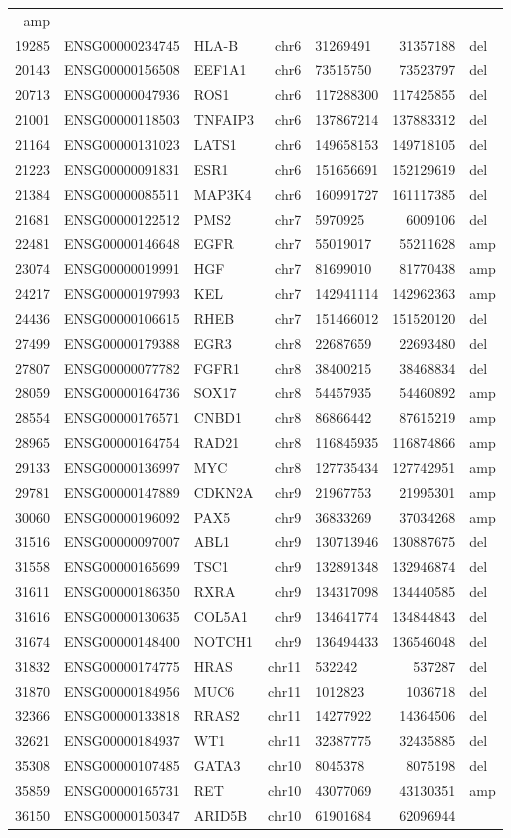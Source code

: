 \documentclass[]{article}
\begin{document}
\begin{longtable}[]{@{}rrlrlrl@{}}
amp\tabularnewline
19285 & ENSG00000234745 & HLA-B & chr6 & 31269491 & 31357188 &
del\tabularnewline
20143 & ENSG00000156508 & EEF1A1 & chr6 & 73515750 & 73523797 &
del\tabularnewline
20713 & ENSG00000047936 & ROS1 & chr6 & 117288300 & 117425855 &
del\tabularnewline
21001 & ENSG00000118503 & TNFAIP3 & chr6 & 137867214 & 137883312 &
del\tabularnewline
21164 & ENSG00000131023 & LATS1 & chr6 & 149658153 & 149718105 &
del\tabularnewline
21223 & ENSG00000091831 & ESR1 & chr6 & 151656691 & 152129619 &
del\tabularnewline
21384 & ENSG00000085511 & MAP3K4 & chr6 & 160991727 & 161117385 &
del\tabularnewline
21681 & ENSG00000122512 & PMS2 & chr7 & 5970925 & 6009106 &
del\tabularnewline
22481 & ENSG00000146648 & EGFR & chr7 & 55019017 & 55211628 &
amp\tabularnewline
23074 & ENSG00000019991 & HGF & chr7 & 81699010 & 81770438 &
amp\tabularnewline
24217 & ENSG00000197993 & KEL & chr7 & 142941114 & 142962363 &
amp\tabularnewline
24436 & ENSG00000106615 & RHEB & chr7 & 151466012 & 151520120 &
del\tabularnewline
27499 & ENSG00000179388 & EGR3 & chr8 & 22687659 & 22693480 &
del\tabularnewline
27807 & ENSG00000077782 & FGFR1 & chr8 & 38400215 & 38468834 &
del\tabularnewline
28059 & ENSG00000164736 & SOX17 & chr8 & 54457935 & 54460892 &
amp\tabularnewline
28554 & ENSG00000176571 & CNBD1 & chr8 & 86866442 & 87615219 &
amp\tabularnewline
28965 & ENSG00000164754 & RAD21 & chr8 & 116845935 & 116874866 &
amp\tabularnewline
29133 & ENSG00000136997 & MYC & chr8 & 127735434 & 127742951 &
amp\tabularnewline
29781 & ENSG00000147889 & CDKN2A & chr9 & 21967753 & 21995301 &
amp\tabularnewline
30060 & ENSG00000196092 & PAX5 & chr9 & 36833269 & 37034268 &
amp\tabularnewline
31516 & ENSG00000097007 & ABL1 & chr9 & 130713946 & 130887675 &
del\tabularnewline
31558 & ENSG00000165699 & TSC1 & chr9 & 132891348 & 132946874 &
del\tabularnewline
31611 & ENSG00000186350 & RXRA & chr9 & 134317098 & 134440585 &
del\tabularnewline
31616 & ENSG00000130635 & COL5A1 & chr9 & 134641774 & 134844843 &
del\tabularnewline
31674 & ENSG00000148400 & NOTCH1 & chr9 & 136494433 & 136546048 &
del\tabularnewline
31832 & ENSG00000174775 & HRAS & chr11 & 532242 & 537287 &
del\tabularnewline
31870 & ENSG00000184956 & MUC6 & chr11 & 1012823 & 1036718 &
del\tabularnewline
32366 & ENSG00000133818 & RRAS2 & chr11 & 14277922 & 14364506 &
del\tabularnewline
32621 & ENSG00000184937 & WT1 & chr11 & 32387775 & 32435885 &
del\tabularnewline
35308 & ENSG00000107485 & GATA3 & chr10 & 8045378 & 8075198 &
del\tabularnewline
35859 & ENSG00000165731 & RET & chr10 & 43077069 & 43130351 &
amp\tabularnewline
36150 & ENSG00000150347 & ARID5B & chr10 & 61901684 & 62096944 &

\end{longtable}
\end{document}
